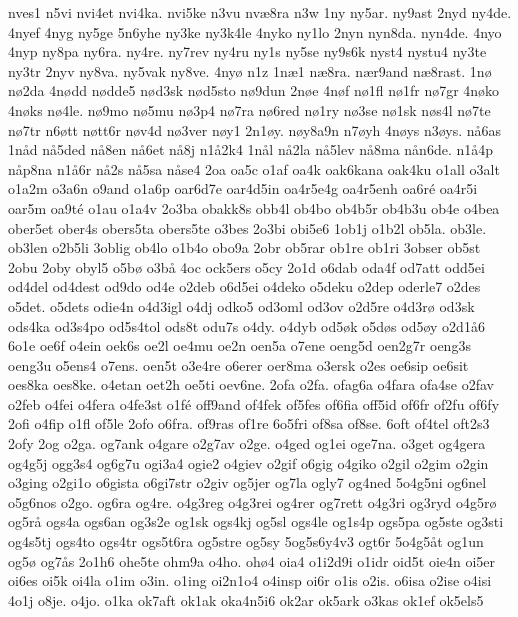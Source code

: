 nves1
n5vi
nvi4et
nvi4ka.
nvi5ke
n3vu
nv^^e68ra
n3w
1ny
ny5ar.
ny9ast
2nyd
ny4de.
4nyef
4nyg
ny5ge
5n6yhe
ny3ke
ny3k4le
4nyko
ny1lo
2nyn
nyn8da.
nyn4de.
4nyo
4nyp
ny8pa
ny6ra.
ny4re.
ny7rev
ny4ru
ny1s
ny5se
ny9s6k
nyst4
nystu4
ny3te
ny3tr
2nyv
ny8va.
ny5vak
ny8ve.
4ny^^f8
n1z
1n^^e61
n^^e68ra.
n^^e6r9and
n^^e68rast.
1n^^f8
n^^f82da
4n^^f8dd
n^^f8dde5
n^^f8d3sk
n^^f8d5sto
n^^f89dun
2n^^f8e
4n^^f8f
n^^f81fl
n^^f81fr
n^^f87gr
4n^^f8ko
4n^^f8ks
n^^f84le.
n^^f89mo
n^^f85mu
n^^f83p4
n^^f87ra
n^^f86red
n^^f81ry
n^^f83se
n^^f81sk
n^^f8s4l
n^^f87te
n^^f87tr
n6^^f8tt
n^^f8tt6r
n^^f8v4d
n^^f83ver
n^^f8y1
2n1^^f8y.
n^^f8y8a9n
n7^^f8yh
4n^^f8ys
n3^^f8ys.
n^^e56as
1n^^e5d
n^^e55ded
n^^e58en
n^^e56et
n^^e58j
n1^^e52k4
1n^^e5l
n^^e52la
n^^e55lev
n^^e58ma
n^^e5n6de.
n1^^e54p
n^^e5p8na
n1^^e56r
n^^e52s
n^^e55sa
n^^e5se4
2oa
oa5c
o1af
oa4k
oak6kana
oak4ku
o1all
o3alt
o1a2m
o3a6n
o9and
o1a6p
oar6d7e
oar4d5in
oa4r5e4g
oa4r5enh
oa6r^^e9
oa4r5i
oar5m
oa9t^^e9
o1au
o1a4v
2o3ba
obakk8s
obb4l
ob4bo
ob4b5r
ob4b3u
ob4e
o4bea
ober5et
ober4s
obers5ta
obers5te
o3bes
2o3bi
obi5e6
1ob1j
o1b2l
ob5la.
ob3le.
ob3len
o2b5li
3oblig
ob4lo
o1b4o
obo9a
2obr
ob5rar
ob1re
ob1ri
3obser
ob5st
2obu
2oby
obyl5
o5b^^f8
o3b^^e5
4oc
ock5ers
o5cy
2o1d
o6dab
oda4f
od7att
odd5ei
od4del
od4dest
od9do
od4e
o2deb
o6d5ei
o4deko
o5deku
o2dep
oderle7
o2des
o5det.
o5dets
odie4n
o4d3igl
o4dj
odko5
od3oml
od3ov
o2d5re
o4d3r^^f8
od3sk
ods4ka
od3s4po
od5s4tol
ods8t
odu7s
o4dy.
o4dyb
od5^^f8k
o5d^^f8s
od5^^f8y
o2d1^^e56
6o1e
oe6f
o4ein
oek6s
oe2l
oe4mu
oe2n
oen5a
o7ene
oeng5d
oen2g7r
oeng3s
oeng3u
o5ens4
o7ens.
oen5t
o3e4re
o6erer
oer8ma
o3ersk
o2es
oe6sip
oe6sit
oes8ka
oes8ke.
o4etan
oet2h
oe5ti
oev6ne.
2ofa
o2fa.
ofag6a
o4fara
ofa4se
o2fav
o2feb
o4fei
o4fera
o4fe3st
o1f^^e9
off9and
of4fek
of5fes
of6fia
off5id
of6fr
of2fu
of6fy
2ofi
o4fip
o1fl
of5le
2ofo
o6fra.
of9ras
of1re
6o5fri
of8sa
of8se.
6oft
of4tel
oft2s3
2ofy
2og
o2ga.
og7ank
o4gare
o2g7av
o2ge.
o4ged
og1ei
oge7na.
o3get
og4gera
og4g5j
ogg3s4
og6g7u
ogi3a4
ogie2
o4giev
o2gif
o6gig
o4giko
o2gil
o2gim
o2gin
o3ging
o2gi1o
o6gista
o6gi7str
o2giv
og5jer
og7la
ogly7
og4ned
5o4g5ni
og6nel
o5g6nos
o2go.
og6ra
og4re.
o4g3reg
o4g3rei
og4rer
og7rett
o4g3ri
og3ryd
o4g5r^^f8
og5r^^e5
ogs4a
ogs6an
og3s2e
og1sk
ogs4kj
og5sl
ogs4le
og1s4p
ogs5pa
og5ste
og3sti
og4s5tj
ogs4to
ogs4tr
ogs5t6ra
og5stre
og5sy
5og5s6y4v3
ogt6r
5o4g5^^e5t
og1un
og5^^f8
og7^^e5s
2o1h6
ohe5te
ohm9a
o4ho.
oh^^f84
oia4
o1i2d9i
o1idr
oid5t
oie4n
oi5er
oi6es
oi5k
oi4la
o1im
o3in.
o1ing
oi2n1o4
o4insp
oi6r
o1is
o2is.
o6isa
o2ise
o4isi
4o1j
o8je.
o4jo.
o1ka
ok7aft
ok1ak
oka4n5i6
ok2ar
ok5ark
o3kas
ok1ef
ok5els5
